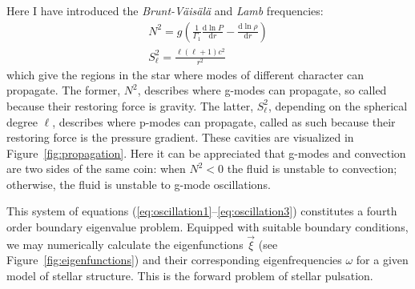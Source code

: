 Here I have introduced the \emph{Brunt-V\"ais\"al\"a} and \emph{Lamb}  frequencies: 
\begin{gather} \label{eq:brunt-vaisala}
    N^2
    =
    g
    \left(
        \frac{1}{\Gamma_1}
        \frac{\text{d} \ln P}{\text{d}r}
        -
        \frac{\text{d} \ln \rho}{\text{d}r}
    \right) 
    \\ \label{eq:lamb}
    S^2_\ell
    =
    \frac{\ell(\ell+1)c^2}{r^2}
\end{gather}
which give the regions in the star where modes of different character can propagate. 
The former, $N^2$, describes where g-modes can propagate, so called because their restoring force is gravity. 
The latter, $S_\ell^2$, depending on the spherical degree $\ell$, describes where p-modes can propagate, called as such because their restoring force is the pressure gradient. 
These cavities are visualized in Figure~\ref{fig:propagation}. 
Here it can be appreciated that g-modes and convection are two sides of the same coin: when ${N^2<0}$ the fluid is unstable to convection; otherwise, the fluid is unstable to g-mode oscillations. 

This system of equations (\ref{eq:oscillation1}--\ref{eq:oscillation3}) constitutes a fourth order boundary eigenvalue problem. 
Equipped with suitable boundary conditions, we may numerically calculate the eigenfunctions $\vec\xi$ (see Figure~\ref{fig:eigenfunctions}) and their corresponding eigenfrequencies $\omega$ for a given model of stellar structure. 
This is the forward problem of stellar pulsation. 


